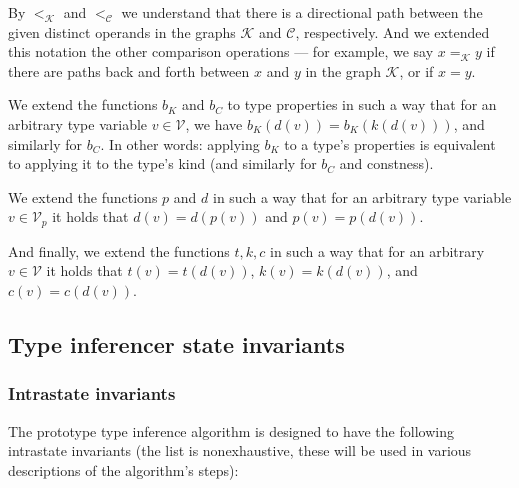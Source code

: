By $<_{\mathcal{K}}$ and $<_{\mathcal{C}}$ we understand that there is a directional path between the given distinct operands in the graphs $\mathcal{K}$ and $\mathcal{C}$, respectively. And we extended this notation the other comparison operations --- for example, we say $x =_{\mathcal{K}} y$ if there are paths back and forth between $x$ and $y$ in the graph $\mathcal{K}$, or if $x = y$.


\begin{defn}
    We extend the functions $b_K$ and $b_C$ to type properties in such a way that for an arbitrary type variable $v \in \mathcal{V}$, we have $b_K (d (v)) = b_K (k (d (v)))$, and similarly for $b_C$. In other words: applying $b_K$ to a type's properties is equivalent to applying it to the type's kind (and similarly for $b_C$ and constness).

    We extend the functions $p$ and $d$ in such a way that for an arbitrary type variable $v \in \mathcal{V}_p$ it holds that $d(v) = d(p(v))$ and $p(v) = p(d(v))$.

    And finally, we extend the functions $t, k, c$ in such a way that for an arbitrary $v \in \mathcal{V}$ it holds that $t (v) = t (d (v))$, $k (v) = k (d (v))$, and $c (v) = c (d (v))$.
\end{defn}

\subsection{Type inferencer state invariants}
\label{sec:invariants}

\subsubsection{Intrastate invariants}

The prototype type inference algorithm is designed to have the following intrastate invariants (the list is nonexhaustive, these will be used in various descriptions of the algorithm's steps):

